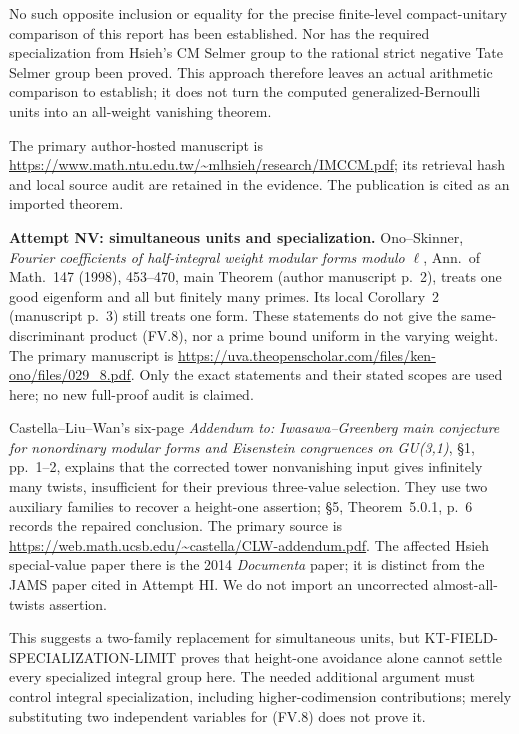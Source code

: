 \documentclass[11pt,a4paper]{article}
\theoremstyle{definition}
\renewcommand{\paragraph}[1]{\par\smallskip\noindent\textbf{#1}\quad\ignorespaces}
\begin{document}
No such opposite inclusion or equality for the precise
finite-level compact-unitary comparison of this report
has been established. Nor has the required specialization
from Hsieh's CM Selmer group to the rational strict negative
Tate Selmer group been proved. This approach therefore leaves
an actual arithmetic comparison to establish; it does not
turn the computed generalized-Bernoulli units into an
all-weight vanishing theorem.

The primary author-hosted manuscript is
\url{https://www.math.ntu.edu.tw/~mlhsieh/research/IMCCM.pdf};
its retrieval hash and local source audit are retained in the
evidence. The publication is cited as an imported theorem.

\paragraph{Attempt NV: simultaneous units and specialization.}
Ono--Skinner, \emph{Fourier coefficients of half-integral weight
modular forms modulo $\ell$}, Ann.\ of Math.\ 147 (1998),
453--470, main Theorem (author manuscript p.~2), treats one
good eigenform and all but finitely many primes. Its local
Corollary~2 (manuscript p.~3) still treats one form. These
statements do not give the same-discriminant product (FV.8),
nor a prime bound uniform in the varying weight. The primary
manuscript is
\url{https://uva.theopenscholar.com/files/ken-ono/files/029_8.pdf}.
Only the exact statements and their stated scopes are used here;
no new full-proof audit is claimed.

Castella--Liu--Wan's six-page \emph{Addendum to: Iwasawa--Greenberg
main conjecture for nonordinary modular forms and Eisenstein
congruences on GU(3,1)}, \S1, pp.~1--2, explains that the corrected
tower nonvanishing input gives infinitely many twists, insufficient
for their previous three-value selection. They use two auxiliary
families to recover a height-one assertion; \S5, Theorem~5.0.1,
p.~6 records the repaired conclusion. The primary source is
\url{https://web.math.ucsb.edu/~castella/CLW-addendum.pdf}.
The affected Hsieh special-value paper there is the 2014
\emph{Documenta} paper; it is distinct from the JAMS paper
cited in Attempt HI. We do not import an uncorrected
almost-all-twists assertion.

This suggests a two-family replacement for simultaneous units,
but KT-FIELD-SPECIALIZATION-LIMIT proves that height-one avoidance
alone cannot settle every specialized integral group here.
The needed additional argument must control integral specialization,
including higher-codimension contributions; merely substituting
two independent variables for (FV.8) does not prove it.
\end{document}
